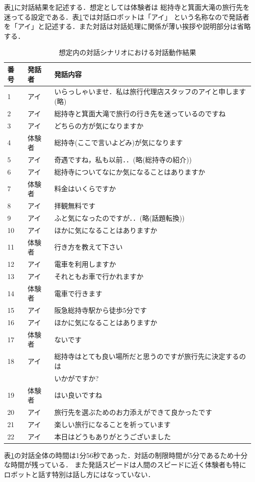表\ref{tbl:result_demo}に対話結果を記述する．想定としては体験者は %
総持寺と箕面大滝の旅行先を迷ってる設定である．表\ref{tbl:result_demo}では対話ロボットは「アイ」
という名称なので発話者を「アイ」と記述する．また対話は対話処理に関係が薄い挨拶や説明部分は省略する．
\begin{table}[hbtp]
    \caption{想定内の対話シナリオにおける対話動作結果}
    \label{tbl:result_demo}
    \centering
    \begin{tabular}{|l|l|l|}
    \hline
    番号 & 発話者 & 発話内容    \\\hline\hline
1 & アイ & いらっしゃいませ．私は旅行代理店スタッフのアイと申します(略)\\\hline
2 & アイ & 総持寺と箕面大滝で旅行の行き先を迷っているのですね\\\hline
3 & アイ & どちらの方が気になりますか \\\hline
4 & 体験者 & 総持寺(ここで言いよどみ)が気になります\\\hline
5 & アイ & 奇遇ですね，私も以前．．(略(総持寺の紹介))\\\hline
6 & アイ & 総持寺についてなにか気になることはありますか\\\hline
7 & 体験者 & 料金はいくらですか\\\hline
8 & アイ & 拝観無料です\\\hline
9 & アイ & ふと気になったのですが．．(略(話題転換)) \\\hline
10 & アイ & ほかに気になることはありますか\\\hline
11 & 体験者 & 行き方を教えて下さい\\\hline
12 & アイ & 電車を利用しますか\\\hline
13 & アイ & それともお車で行かれますか\\\hline
14 & 体験者 & 電車で行きます\\\hline
15 & アイ & 阪急総持寺駅から徒歩5分です\\\hline
16 & アイ & ほかに気になることはありますか\\\hline
17 & 体験者 & ないです\\\hline
18 & アイ & 総持寺はとても良い場所だと思うのですが旅行先に決定するのは\\
   &      & いかがですか?\\\hline
19 & 体験者 & はい良いですね\\\hline
20 & アイ & 旅行先を選ぶためのお力添えができて良かったです\\\hline
21 & アイ & 楽しい旅行になることを祈っています\\\hline
22 & アイ & 本日はどうもありがとうございました\\\hline
\end{tabular}
\end{table}
表\ref{tbl:result_demo}の対話全体の時間は1分56秒であった．対話の制限時間が5分であるため十分な時間が残っている．
また発話スピードは人間のスピードに近く体験者も特にロボットと話す特別は話し方にはなっていない．

